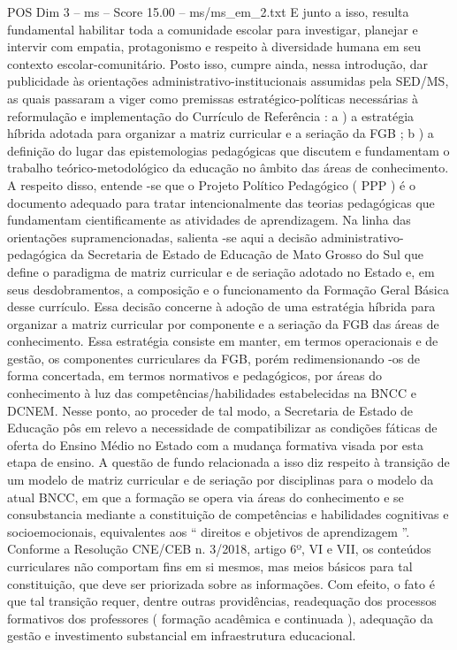 \begin{textsample}{POS Dim 3 – ms – Score 15.00 – ms/ms\_em\_2.txt}
E junto a isso, resulta fundamental habilitar toda a comunidade escolar para investigar, planejar e intervir com empatia, protagonismo e respeito à diversidade humana em seu contexto escolar-comunitário.
Posto isso, cumpre ainda, nessa introdução, dar publicidade às orientações administrativo-institucionais assumidas pela SED/MS, as quais passaram a viger como premissas estratégico-políticas necessárias à reformulação e implementação do Currículo de Referência : a ) a estratégia híbrida adotada para organizar a matriz curricular e a seriação da FGB ; b ) a definição do lugar das epistemologias pedagógicas que discutem e fundamentam o trabalho teórico-metodológico da educação no âmbito das áreas de conhecimento.
A respeito disso, entende -se que o Projeto Político Pedagógico ( PPP ) é o documento adequado para tratar intencionalmente das teorias pedagógicas que fundamentam cientificamente as atividades de aprendizagem.
Na linha das orientações supramencionadas, salienta -se aqui a decisão administrativo-pedagógica da Secretaria de Estado de Educação de Mato Grosso do Sul que define o paradigma de matriz curricular e de seriação adotado no Estado e, em seus desdobramentos, a composição e o funcionamento da Formação Geral Básica desse currículo.
Essa decisão concerne à adoção de uma estratégia híbrida para organizar a matriz curricular por componente e a seriação da FGB das áreas de conhecimento.
Essa estratégia consiste em manter, em termos operacionais e de gestão, os componentes curriculares da FGB, porém redimensionando -os de forma concertada, em termos normativos e pedagógicos, por áreas do conhecimento à luz das competências/habilidades estabelecidas na BNCC e DCNEM.
Nesse ponto, ao proceder de tal modo, a Secretaria de Estado de Educação pôs em relevo a necessidade de compatibilizar as condições fáticas de oferta do Ensino Médio no Estado com a mudança formativa visada por esta etapa de ensino.
A questão de fundo relacionada a isso diz respeito à transição de um modelo de matriz curricular e de seriação por disciplinas para o modelo da atual BNCC, em que a formação se opera via áreas do conhecimento e se consubstancia mediante a constituição de competências e habilidades cognitivas e socioemocionais, equivalentes aos “ direitos e objetivos de aprendizagem ”.
Conforme a Resolução CNE/CEB n. 3/2018, artigo 6º, VI e VII, os conteúdos curriculares não comportam fins em si mesmos, mas meios básicos para tal constituição, que deve ser priorizada sobre as informações.
Com efeito, o fato é que tal transição requer, dentre outras providências, readequação dos processos formativos dos professores ( formação acadêmica e continuada ), adequação da gestão e investimento substancial em infraestrutura educacional.

\end{textsample}
